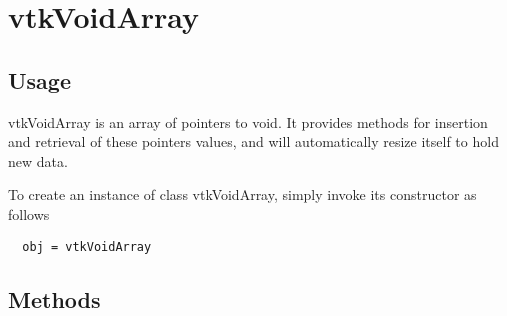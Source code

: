 \section{vtkVoidArray}

\subsection{Usage}

 vtkVoidArray is an array of pointers to void. It provides methods
 for insertion and retrieval of these pointers values, and will 
 automatically resize itself to hold new data.

To create an instance of class vtkVoidArray, simply
invoke its constructor as follows
\begin{verbatim}
  obj = vtkVoidArray
\end{verbatim}
\subsection{Methods}


